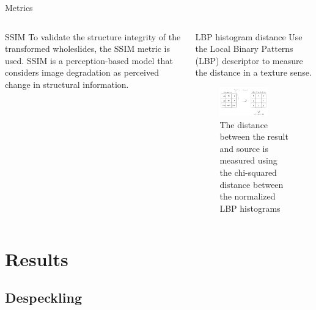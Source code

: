 \documentclass[t]{beamer}
\begin{document}
\begin{frame}{Metrics}

\begin{columns}

\begin{column}{0.5\textwidth}
\begin{block}{SSIM}
To validate the structure integrity of the transformed wholeslides, the
SSIM metric is used.
SSIM is a perception-based model that considers image degradation as
perceived change in structural information.
\end{block}
\end{column}

\begin{column}{0.5\textwidth}

\begin{block}{LBP histogram distance}
Use the Local Binary Patterns (LBP) descriptor to measure the distance
in a texture sense.
\end{block}

\begin{figure}
\centering
\includegraphics[width=0.7\textwidth]{lbp}
\caption{The distance between the result and source is measured using
the chi-squared distance between the normalized LBP histograms}
\end{figure}

\end{column}

\end{columns}

\end{frame}


\section{Results}

\subsection{Despeckling}
\end{document}
